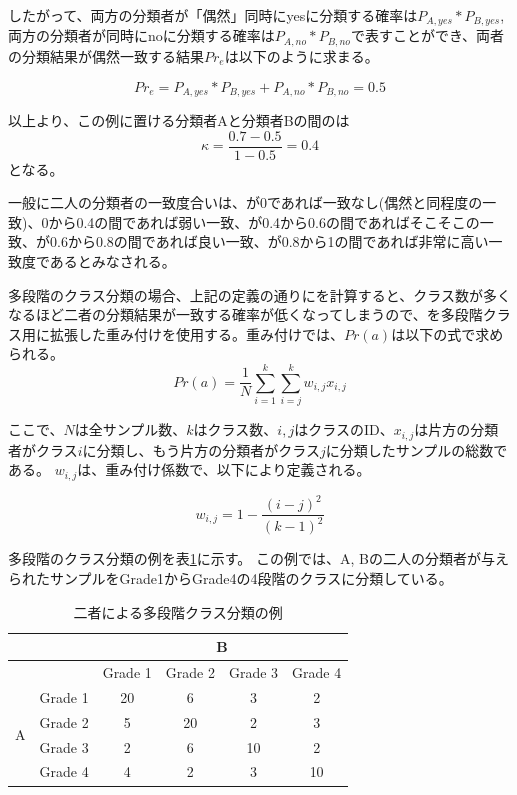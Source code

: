 \documentclass[12pt]{jarticle}
\begin{document}
したがって、両方の分類者が「偶然」同時にyesに分類する確率は$P_{A,yes}*P_{B,yes}$, 両方の分類者が同時にnoに分類する確率は$P_{A,no}*P_{B,no}$で表すことができ、両者の分類結果が偶然一致する結果$Pr_{e}$は以下のように求まる。

\begin{equation}
Pr_{e} = P_{A,yes}*P_{B,yes} + P_{A,no}*P_{B,no} = 0.5
\end{equation}

以上より、この例に置ける分類者Aと分類者Bの間の\kappac は
\begin{equation}
\kappa = \frac{0.7 - 0.5}{1 - 0.5} = 0.4
\end{equation}
となる。

一般に二人の分類者の一致度合いは、\kappac が0であれば一致なし(偶然と同程度の一致)、0から0.4の間であれば弱い一致、\kappac が0.4から0.6の間であればそこそこの一致、\kappac が0.6から0.8の間であれば良い一致、\kappac が0.8から1の間であれば非常に高い一致度であるとみなされる。

多段階のクラス分類の場合、上記の定義の通りに\kappac を計算すると、クラス数が多くなるほど二者の分類結果が一致する確率が低くなってしまうので、\kappac を多段階クラス用に拡張した重み付け\kappac を使用する。重み付け\kappac では、$Pr(a)$は以下の式で求められる。
\begin{equation}
Pr(a) = \frac{1}{N} \sum _{i=1} ^{k} \sum _{i=j} ^{k} w_{i,j} x_{i, j}
\end{equation}

ここで、$N$は全サンプル数、$k$はクラス数、$i, j$はクラスのID、$x_{i, j}$は片方の分類者がクラス$i$に分類し、もう片方の分類者がクラス$j$に分類したサンプルの総数である。
$w_{i, j}$は、重み付け係数で、以下により定義される。

\begin{equation}
w_{i, j} = 1 - \frac{(i - j)^2}{(k-1)^2}
\end{equation}

多段階のクラス分類の例を表\ref{classifi_4}に示す。
この例では、A, Bの二人の分類者が与えられたサンプルをGrade1からGrade4の4段階のクラスに分類している。

\begin{table}
\begin{center}
\caption{二者による多段階クラス分類の例}
\label{classifi_4}
\begin{tabular}[t]{|c|c|c|c|c|c|}
  \hline
  \multirow{2}{*}{} & & \multicolumn{4}{|c|}{B} \\ \hline
                            &   & Grade 1 & Grade 2 & Grade 3 & Grade 4 \\ \hline
  \multirow{4}{*}{A} & Grade 1  & 20 &  6 &  3 &  2   \\ \cline{2-6}
                     & Grade 2  &  5 & 20 &  2 &  3   \\ \cline{2-6}
                     & Grade 3  &  2 &  6 & 10 &  2   \\ \cline{2-6}
                     & Grade 4  &  4 &  2 &  3 &  10   \\ \hline
\end{tabular}
\end{center}
\end{table}
\end{document}
